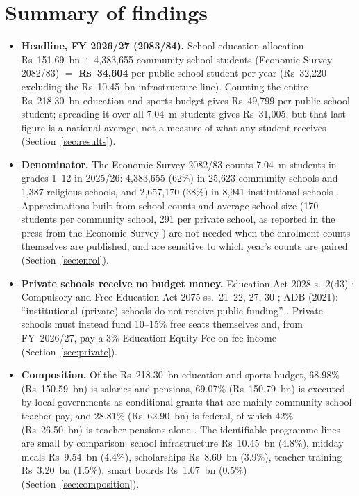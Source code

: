 \documentclass[11pt,a4paper]{article}
\begin{document}
\section{Summary of findings}
\begin{itemize}[leftmargin=1.4em]
\item \textbf{Headline, FY 2026/27 (2083/84).} School-education allocation Rs~151.69~bn \cite{radionepal2026} $\div$ 4,383,655 community-school students (Economic Survey 2082/83) \cite{kp2026es} $= $ \textbf{Rs~34,604} per public-school student per year (Rs~32,220 excluding the Rs~10.45~bn infrastructure line). Counting the entire Rs~218.30~bn education and sports budget gives Rs~49,799 per public-school student; spreading it over all 7.04~m students gives Rs~31,005, but that last figure is a national average, not a measure of what any student receives (Section~\ref{sec:results}).
\item \textbf{Denominator.} The Economic Survey 2082/83 counts 7.04~m students in grades 1--12 in 2025/26: 4,383,655 (62\%) in 25,623 community schools and 1,387 religious schools, and 2,657,170 (38\%) in 8,941 institutional schools \cite{kp2026es}. Approximations built from school counts and average school size (170 students per community school, 291 per private school, as reported in the press from the Economic Survey \cite{edukhabar2025}) are not needed when the enrolment counts themselves are published, and are sensitive to which year's counts are paired (Section~\ref{sec:enrol}).
\item \textbf{Private schools receive no budget money.} Education Act 2028 s.~2(d3) \cite{eduact1971}; Compulsory and Free Education Act 2075 ss.~21--22, 27, 30 \cite{cfe2018}; ADB (2021): ``institutional (private) schools do not receive public funding'' \cite{adb2021}. Private schools must instead fund 10--15\% free seats themselves and, from FY~2026/27, pay a 3\% Education Equity Fee on fee income \cite{ican2026} (Section~\ref{sec:private}).
\item \textbf{Composition.} Of the Rs~218.30~bn education and sports budget, 68.98\% (Rs~150.59~bn) is salaries and pensions, 69.07\% (Rs~150.79~bn) is executed by local governments as conditional grants that are mainly community-school teacher pay, and 28.81\% (Rs~62.90~bn) is federal, of which 42\% (Rs~26.50~bn) is teacher pensions alone \cite{ratopati2026,ican2026}. The identifiable programme lines are small by comparison: school infrastructure Rs~10.45~bn (4.8\%), midday meals Rs~9.54~bn (4.4\%), scholarships Rs~8.60~bn (3.9\%), teacher training Rs~3.20~bn (1.5\%), smart boards Rs~1.07~bn (0.5\%) \cite{radionepal2026,republica_meals2026,mof2026,khabarhub2026,republica_budget2026} (Section~\ref{sec:composition}).

\end{itemize}
\end{document}

